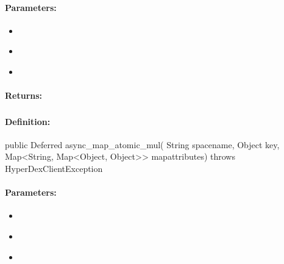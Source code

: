 \paragraph{Parameters:}
\begin{itemize}[noitemsep]
\item {}\\

\item {}\\

\item {}\\

\end{itemize}

\paragraph{Returns:}


\pagebreak
\subsubsection{}
\label{api:java:async_map_atomic_mul}


\paragraph{Definition:}
\begin{javacode}
public Deferred async_map_atomic_mul(
        String spacename,
        Object key,
        Map<String, Map<Object, Object>> mapattributes) throws HyperDexClientException
\end{javacode}

\paragraph{Parameters:}
\begin{itemize}[noitemsep]
\item {}\\

\item {}\\

\item {}\\

\end{itemize}

